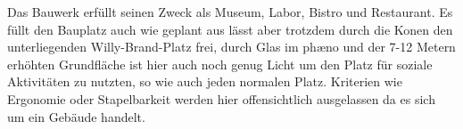 \documentclass[a4paper, 12p]{article}
\begin{document}

Das Bauwerk erfüllt seinen Zweck als Museum, Labor, Bistro und Restaurant. Es
füllt den Bauplatz auch wie geplant aus lässt aber trotzdem durch die Konen den
unterliegenden Willy-Brand-Platz frei, durch Glas im phæno und der 7-12 Metern erhöhten
Grundfläche ist hier auch noch genug Licht um den Platz für soziale Aktivitäten
zu nutzten, so wie auch jeden normalen Platz. Kriterien wie Ergonomie oder
Stapelbarkeit werden hier offensichtlich ausgelassen da es sich um ein Gebäude
handelt.
\end{document}
